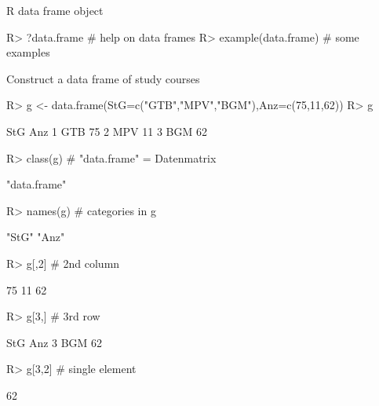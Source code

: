 \documentclass[10pt]{beamer}
\let\proglang=\textsf
\begin{document}
%
\begin{frame}[fragile]{\proglang{R} data frame object}
\begin{Schunk}
\begin{Sinput}
R> ?data.frame    # help on data frames
R> example(data.frame)   # some examples
\end{Sinput}
\end{Schunk}
Construct a data frame of study courses
\begin{Schunk}
\begin{Sinput}
R> g <- data.frame(StG=c("GTB","MPV","BGM"),Anz=c(75,11,62))
R> g
\end{Sinput}
\begin{Soutput}
  StG Anz
1 GTB  75
2 MPV  11
3 BGM  62
\end{Soutput}
\begin{Sinput}
R> class(g)   # "data.frame" = Datenmatrix
\end{Sinput}
\begin{Soutput}
[1] "data.frame"
\end{Soutput}
\begin{Sinput}
R> names(g)   # categories in g
\end{Sinput}
\begin{Soutput}
[1] "StG" "Anz"
\end{Soutput}
\begin{Sinput}
R> g[,2]	   # 2nd column
\end{Sinput}
\begin{Soutput}
[1] 75 11 62
\end{Soutput}
\begin{Sinput}
R> g[3,]	   # 3rd row
\end{Sinput}
\begin{Soutput}
  StG Anz
3 BGM  62
\end{Soutput}
\begin{Sinput}
R> g[3,2]	   # single element
\end{Sinput}
\begin{Soutput}
[1] 62
\end{Soutput}
\end{Schunk}
\end{frame}
%
\end{document}
